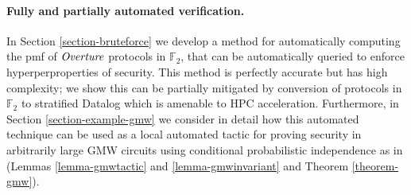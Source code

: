 \paragraph{Fully and partially automated verification.} In Section
\ref{section-bruteforce} we develop a method for automatically
computing the pmf of $\mathit{Overture}$ protocols in $\mathbb{F}_2$, that can
be automatically queried to enforce hyperperproperties of
security. This method is perfectly accurate but has high complexity;
we show this can be partially mitigated by conversion of protocols in
$\mathbb{F}_2$ to stratified Datalog which is amenable to HPC
acceleration. Furthermore, in Section \ref{section-example-gmw} we
consider in detail how this automated technique can be used as a local
automated tactic for proving security in arbitrarily large GMW
circuits using conditional probabilistic independence as in
\cite{li2023lilac} (Lemmas \ref{lemma-gmwtactic} and \ref{lemma-gmwinvariant}
and Theorem \ref{theorem-gmw}).
